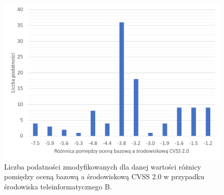 \begin{figure}[!ht]
\centering
\includegraphics[width=.9\textwidth]{Chapters/Eksperymenty/env_B_results/changes_cvss_2.pdf}
\caption{Liczba podatności zmodyfikowanych dla danej wartości różnicy pomiędzy oceną bazową a środowiskową CVSS 2.0 w przypadku środowiska teleinformatycznego B.}
\label{fig:chapter6:env_b:cvss_2_changes}
\end{figure}

